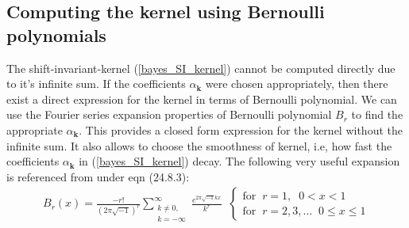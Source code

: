 \documentclass[twocolumn]{svjour3}          %
\newcommand{\bm}[1]{\boldsymbol{#1}}
\newcommand{\vk}{\bm{k}}
\begin{document}
\subsection{Computing the kernel using Bernoulli polynomials}
The shift-invariant-kernel (\ref{bayes_SI_kernel}) cannot be computed directly due to it's  infinite sum. 
If the coefficients $\alpha_{\vk}$ were chosen appropriately, then there exist a direct expression for the kernel in terms of Bernoulli polynomial. 
We can use the Fourier series expansion properties \cite{DLMF} of Bernoulli polynomial $B_r$ to find the appropriate $\alpha_{\vk}$. This provides a closed form expression for the kernel without the infinite sum. It also allows to choose the smoothness of kernel, i.e, how fast the coefficients $\alpha_{\vk}$ in (\ref{bayes_SI_kernel}) decay.
The following very useful expansion is referenced from \cite{DLMF} under eqn (24.8.3):
\begin{align}
\label{dlmf_bernoulli_24_8_3}
B_{r}(x) = \frac{-r!}{(2 \pi \sqrt{-1})^{r}} 
\sum_{\substack{k \neq 0,\\ k=-\infty}}^\infty 
\frac{e^{2\pi\sqrt{-1} k x}}{k^{r}}
\;\;
\begin{cases}
\text{for} \;\; r=1, \;\; 0 < x < 1 \\
\text{for} \;\; r=2,3,\hdots \;\; 0 \leq x \leq 1
\end{cases}
\end{align}
\end{document}

